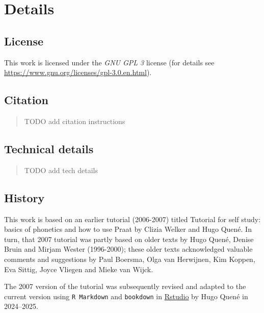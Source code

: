 \documentclass[
]{book}
\begin{document}
\section*{Details}\label{details}

\subsection*{License}\label{license}

This work is licensed under the \emph{GNU GPL 3} license (for details see
\url{https://www.gnu.org/licenses/gpl-3.0.en.html}).

\subsection*{Citation}\label{citation}

\begin{quote}
TODO add citation instructions
\end{quote}

\subsection*{Technical details}\label{technical-details}

\begin{quote}
TODO add tech details
\end{quote}

\subsection*{History}\label{history}

This work is based on an earlier tutorial (2006-2007) titled Tutorial for self study: basics of phonetics and how to use Praat by Clizia Welker and Hugo Quené. In turn, that 2007 tutorial was partly based on older texts by Hugo Quené, Denise Bruin and Mirjam Wester (1996-2000); these older texts acknowledged valuable comments and suggestions by Paul Boersma, Olga van Herwijnen, Kim Koppen, Eva Sittig, Joyce Vliegen and Mieke van Wijck.

The 2007 version of the tutorial was subsequently revised and adapted to the current version using \texttt{R\ Markdown} \citep{rmarkdown2018} and \texttt{bookdown} \citep{R-bookdown} in \href{https://www.rstudio.com}{Rstudio} by Hugo Quené in 2024--2025.
\end{document}

